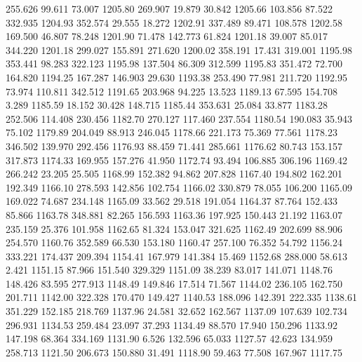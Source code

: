  255.626   99.611   73.007      1205.80
 269.907   19.879   30.842      1205.66
 103.856   87.522  332.935      1204.93
 352.574   29.555   18.272      1202.91
 337.489   89.471  108.578      1202.58
 169.500   46.807   78.248      1201.90
  71.478  142.773   61.824      1201.18
  39.007   85.017  344.220      1201.18
 299.027  155.891  271.620      1200.02
 358.191   17.431  319.001      1195.98
 353.441   98.283  322.123      1195.98
 137.504   86.309  312.599      1195.83
 351.472   72.700  164.820      1194.25
 167.287  146.903   29.630      1193.38
 253.490   77.981  211.720      1192.95
  73.974  110.811  342.512      1191.65
 203.968   94.225   13.523      1189.13
  67.595  154.708    3.289      1185.59
  18.152   30.428  148.715      1185.44
 353.631   25.084   33.877      1183.28
 252.506  114.408  230.456      1182.70
 270.127  117.460  237.554      1180.54
 190.083   35.943   75.102      1179.89
 204.049   88.913  246.045      1178.66
 221.173   75.369   77.561      1178.23
 346.502  139.970  292.456      1176.93
  88.459   71.441  285.661      1176.62
  80.743  153.157  317.873      1174.33
 169.955  157.276   41.950      1172.74
  93.494  106.885  306.196      1169.42
 266.242   23.205   25.505      1168.99
 152.382   94.862  207.828      1167.40
 194.802  162.201  192.349      1166.10
 278.593  142.856  102.754      1166.02
 330.879   78.055  106.200      1165.09
 169.022   74.687  234.148      1165.09
  33.562   29.518  191.054      1164.37
  87.764  152.433   85.866      1163.78
 348.881   82.265  156.593      1163.36
 197.925  150.443   21.192      1163.07
 235.159   25.376  101.958      1162.65
  81.324  153.047  321.625      1162.49
 202.699   88.906  254.570      1160.76
 352.589   66.530  153.180      1160.47
 257.100   76.352   54.792      1156.24
 333.221  174.437  209.394      1154.41
 167.979  141.384   15.469      1152.68
 288.000   58.613    2.421      1151.15
  87.966  151.540  329.329      1151.09
  38.239   83.017  141.071      1148.76
 148.426   83.595  277.913      1148.49
 149.846   17.514   71.567      1144.02
 236.105  162.750  201.711      1142.00
 322.328  170.470  149.427      1140.53
 188.096  142.391  222.335      1138.61
 351.229  152.185  218.769      1137.96
  24.581   32.652  162.567      1137.09
 107.639  102.734  296.931      1134.53
 259.484   23.097   37.293      1134.49
  88.570   17.940  150.296      1133.92
 147.198   68.364  334.169      1131.90
   6.526  132.596   65.033      1127.57
  42.623  134.959  258.713      1121.50
 206.673  150.880   31.491      1118.90
  59.463   77.508  167.967      1117.75
